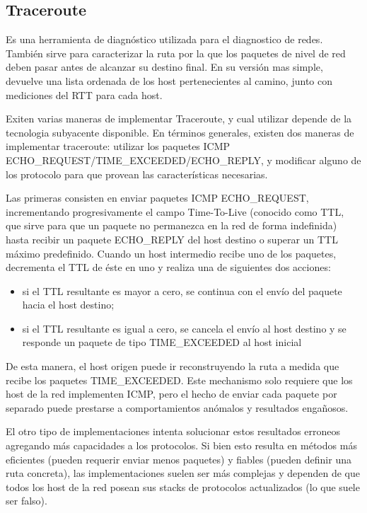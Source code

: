 \subsection{Traceroute}

Es una herramienta de diagnóstico utilizada para el diagnostico de redes. También sirve para caracterizar la ruta por la que los paquetes de nivel de red deben pasar antes de alcanzar su destino final. En su versión mas simple, devuelve una lista ordenada de los host pertenecientes al camino, junto con mediciones del RTT para cada host.

Exiten varias maneras de implementar Traceroute, y cual utilizar depende de la tecnologia subyacente disponible. 
En términos generales, existen dos maneras de implementar traceroute: utilizar los paquetes ICMP ECHO\_REQUEST/TIME\_EXCEEDED/ECHO\_REPLY, y modificar alguno de los protocolo para que provean las características necesarias. 

Las primeras consisten en enviar paquetes ICMP ECHO\_REQUEST, incrementando progresivamente el campo Time-To-Live (conocido como TTL, que sirve para que un paquete no permanezca en la red de forma indefinida) hasta recibir un paquete ECHO\_REPLY del host destino o superar un TTL máximo predefinido. Cuando un host intermedio recibe uno de los paquetes, decrementa el TTL de éste en uno y realiza una de siguientes dos acciones:
\begin{itemize}
\item{si el TTL resultante es mayor a cero, se continua con el envío del paquete hacia el host destino;}
\item{si el TTL resultante es igual a cero, se cancela el envío al host destino y se responde un paquete de tipo TIME\_EXCEEDED al host inicial}
 \end{itemize}

 De esta manera, el host origen puede ir reconstruyendo la ruta a medida que recibe los paquetes TIME\_EXCEEDED. Este mechanismo solo requiere que los host de la red implementen ICMP, pero el hecho de enviar cada paquete por separado puede prestarse a comportamientos anómalos y resultados engañosos.

El otro tipo de implementaciones intenta solucionar estos resultados erroneos agregando más capacidades a los protocolos. Si bien esto resulta en métodos más eficientes (pueden requerir enviar menos paquetes) y fiables (pueden definir una ruta concreta), las implementaciones suelen ser más complejas y dependen de que todos los host de la red posean sus stacks de protocolos actualizados (lo que suele ser falso).



